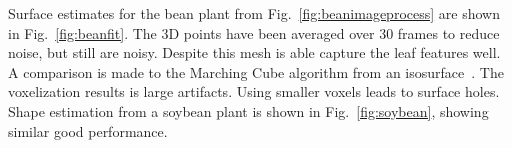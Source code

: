 Surface estimates for the bean plant from Fig.~\ref{fig:beanimageprocess} are shown in Fig.~\ref{fig:beanfit}.  The 3D points have been averaged over 30 frames to reduce noise, but still are noisy.  Despite this mesh is able capture the leaf features well.  A comparison is made to the Marching Cube algorithm from an isosurface~\cite{}.  The voxelization results is large artifacts.  Using smaller voxels leads to surface holes.  Shape estimation from a soybean plant is shown in Fig.~\ref{fig:soybean}, showing similar good performance.
